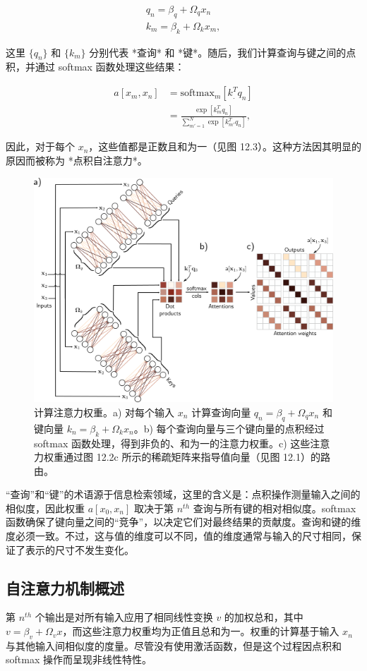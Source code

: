 \begin{align}
q_n = \beta_q + \Omega_qx_n \\
k_m = \beta_k + \Omega_kx_m, 
\end{align}


这里 \(\{q_n\}\) 和 \(\{k_m\}\) 分别代表 *查询* 和 *键*。随后，我们计算查询与键之间的点积，并通过 softmax 函数处理这些结果：


\begin{align}
a[x_m, x_n] &= \text{softmax}_{m} [k_.^T q_n] \\
&= \frac{\exp[k_m^T q_n]}{\sum_{m'=1}^N \exp[k_{m'}^T q_n]}, 
\end{align} 


因此，对于每个 \(x_n\)，这些值都是正数且和为一（见图 12.3）。这种方法因其明显的原因而被称为 *点积自注意力*。

\begin{figure}[ht!]
\centering
\includegraphics[width=0.7\linewidth]{png/chapter12/TransformerSA2.png}
\caption{计算注意力权重。a) 对每个输入 \(x_n\) 计算查询向量 \(q_n = \beta_q + \Omega_qx_n\) 和键向量 \(k_n = \beta_k + \Omega_kx_n\)。b) 每个查询向量与三个键向量的点积经过 softmax 函数处理，得到非负的、和为一的注意力权重。c) 这些注意力权重通过图 12.2c 所示的稀疏矩阵来指导值向量（见图 12.1）的路由。}
\end{figure}



“查询”和“键”的术语源于信息检索领域，这里的含义是：点积操作测量输入之间的相似度，因此权重 \(a[x_0, x_n]\) 取决于第 \(n^{th}\) 查询与所有键的相对相似度。softmax 函数确保了键向量之间的“竞争”，以决定它们对最终结果的贡献度。查询和键的维度必须一致。不过，这与值的维度可以不同，值的维度通常与输入的尺寸相同，保证了表示的尺寸不发生变化。

\subsection{自注意力机制概述}
第 \(n^{th}\) 个输出是对所有输入应用了相同线性变换 \(v\) 的加权总和，其中 \(v = \beta_v + \Omega_vx\)，而这些注意力权重均为正值且总和为一。权重的计算基于输入 \(x_n\) 与其他输入间相似度的度量。尽管没有使用激活函数，但是这个过程因点积和 softmax 操作而呈现非线性特性。

